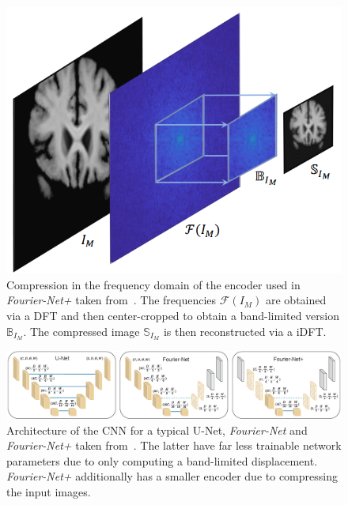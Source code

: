 \begin{figure}[h] %
	\centering
	\graphicspath{{images/}{\main/images/}}
	\includegraphics[width=.65\linewidth]{CompressionEncoder.png} 
	\caption{Compression in the frequency domain of the encoder used in \emph{Fourier-Net+} taken from~\cite{Fourier-Net+}. The frequencies $\mathcal{F}(I_M)$ are obtained via a DFT and then center-cropped to obtain a band-limited version $\mathbb{B}_{I_M}$. The compressed image $\mathbb{S}_{I_M}$ is then reconstructed via a iDFT.}
	\label{fig:Fourier-Net+EncoderCompression}
\end{figure}

\begin{figure}[h] %
	\centering
	\graphicspath{{images/}{\main/images/}}
	\includegraphics[width=\linewidth]{ArchitectureFourier-Net+CNN.png} 
	\caption{Architecture of the CNN for a typical U-Net, \emph{Fourier-Net} and \emph{Fourier-Net+} taken from~\cite{Fourier-Net+}. The latter have far less trainable network parameters due to only computing a band-limited displacement. \emph{Fourier-Net+} additionally has a smaller encoder due to compressing the input images.} %
	\label{fig:Fourier-Net+CNN}
\end{figure}

